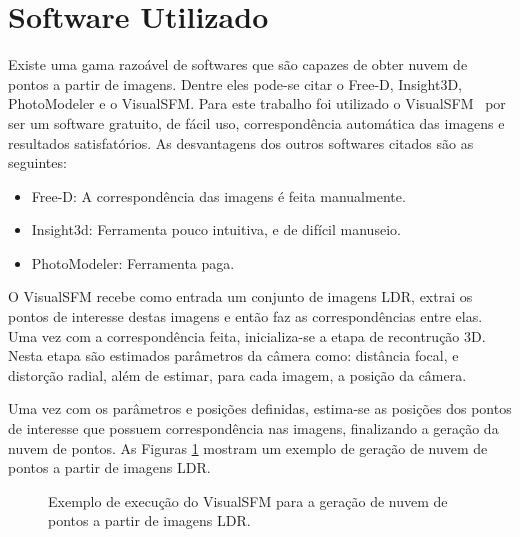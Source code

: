 \section{Software Utilizado} \label{pontosSoftware}

Existe uma gama razoável de softwares que são capazes de obter nuvem de pontos a partir de imagens. Dentre eles pode-se citar o Free-D, Insight3D, PhotoModeler e o VisualSFM. Para este trabalho foi utilizado o VisualSFM~\cite{visualSFM} por ser um software gratuito, de fácil uso, correspondência automática das imagens e resultados satisfatórios. As desvantagens dos outros softwares citados são as seguintes:

\begin{itemize}
\item Free-D: A correspondência das imagens é feita manualmente.
\item Insight3d: Ferramenta pouco intuitiva, e de difícil manuseio.
\item PhotoModeler: Ferramenta paga.
\end{itemize}

O VisualSFM recebe como entrada um conjunto de imagens LDR, extrai os pontos de interesse destas imagens e então faz as correspondências entre elas. Uma vez com a correspondência feita, inicializa-se a etapa de recontrução 3D. Nesta etapa são estimados parâmetros da câmera como: distância focal, e distorção radial, além de estimar, para cada imagem, a posição da câmera.

Uma vez com os parâmetros e posições definidas, estima-se as posições dos pontos de interesse que possuem correspondência nas imagens, finalizando a geração da nuvem de pontos. As Figuras \ref{figExemploSFM} mostram um exemplo de geração de nuvem de pontos a partir de imagens LDR.

\begin{figure}[H]
  \centering
  \quad %
  \quad %
  \caption{Exemplo de execução do VisualSFM para a geração de nuvem de pontos a partir de imagens LDR.}
  \label{figExemploSFM}
\end{figure}
